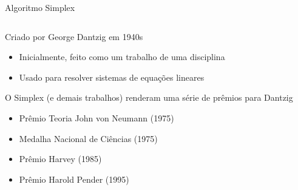 \documentclass[compress,mathserif]{beamer}
\begin{document}
\begin{frame}{Algoritmo Simplex}

\begin{columns}[T]
    \begin{column}{.69\textwidth}
    Criado por George Dantzig em 1940s
    \begin{itemize}
        \item Inicialmente, feito como um trabalho de uma disciplina
        \item Usado para resolver sistemas de equações lineares
    \end{itemize}
    
    \vspace{0.5cm}
    
    O Simplex (e demais trabalhos) renderam uma série de prêmios para Dantzig
    \begin{itemize}
        \item Prêmio Teoria John von Neumann (1975)
        \item Medalha Nacional de Ciências (1975)
        \item Prêmio Harvey (1985)
        \item Prêmio Harold Pender (1995)
    \end{itemize}
    
\end{column}
    \begin{column}{.39\textwidth}
    

\end{column}
\end{columns}
\end{frame}
\end{document}
